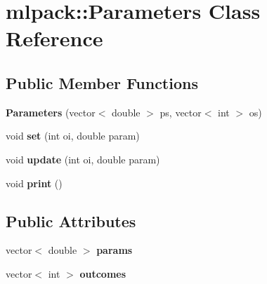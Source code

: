 \hypertarget{classmlpack_1_1_parameters}{
\section{mlpack::Parameters Class Reference}
\label{classmlpack_1_1_parameters}
}
\subsection*{Public Member Functions}
\begin{DoxyCompactItemize}
\item 
\hypertarget{classmlpack_1_1_parameters_a3b1607f330f62f352670a1eade883afa}{
{\bfseries Parameters} (vector$<$ double $>$ ps, vector$<$ int $>$ os)}
\label{classmlpack_1_1_parameters_a3b1607f330f62f352670a1eade883afa}

\item 
\hypertarget{classmlpack_1_1_parameters_af513fa33bf660fd0d9183f758c11ee28}{
void {\bfseries set} (int oi, double param)}
\label{classmlpack_1_1_parameters_af513fa33bf660fd0d9183f758c11ee28}

\item 
\hypertarget{classmlpack_1_1_parameters_aebf0fb11b56c77a449e4b6088acc9d98}{
void {\bfseries update} (int oi, double param)}
\label{classmlpack_1_1_parameters_aebf0fb11b56c77a449e4b6088acc9d98}

\item 
\hypertarget{classmlpack_1_1_parameters_a2e1515cb0149f5cd94789d0dc11862be}{
void {\bfseries print} ()}
\label{classmlpack_1_1_parameters_a2e1515cb0149f5cd94789d0dc11862be}

\end{DoxyCompactItemize}
\subsection*{Public Attributes}
\begin{DoxyCompactItemize}
\item 
\hypertarget{classmlpack_1_1_parameters_af31dff55c545ca31a9c81b6b07508829}{
vector$<$ double $>$ {\bfseries params}}
\label{classmlpack_1_1_parameters_af31dff55c545ca31a9c81b6b07508829}

\item 
\hypertarget{classmlpack_1_1_parameters_ad23ef76f46921512d9a9dc6b3630884c}{
vector$<$ int $>$ {\bfseries outcomes}}
\label{classmlpack_1_1_parameters_ad23ef76f46921512d9a9dc6b3630884c}

\end{DoxyCompactItemize}
